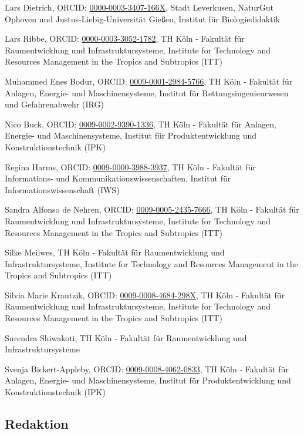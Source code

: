 \documentclass[
  letterpaper,
  DIV=11,
  numbers=noendperiod]{scrartcl}
\begin{document}
Lars Dietrich, ORCID:
\href{https://orcid.org/0000-0003-3407-166X}{0000-0003-3407-166X}, Stadt
Leverkusen, NaturGut Ophoven und Justus-Liebig-Universität Gießen,
Institut für Biologiedidaktik

Lars Ribbe, ORCID:
\href{https://orcid.org/0000-0003-3052-1782}{0000-0003-3052-1782}, TH
Köln - Fakultät für Raumentwicklung und Infrastruktursysteme, Institute
for Technology and Resources Management in the Tropics and Subtropics
(ITT)

Muhammed Enes Bodur, ORCID:
\href{https://orcid.org/0009-0001-2984-5766}{0009-0001-2984-5766}, TH
Köln - Fakultät für Anlagen, Energie- und Maschinensysteme, Institut für
Rettungsingenieurwesen und Gefahrenabwehr (IRG)

Nico Buck, ORCID:
\href{https://orcid.org/0009-0002-9390-1336}{0009-0002-9390-1336}, TH
Köln - Fakultät für Anlagen, Energie- und Maschinensysteme, Institut für
Produktentwicklung und Konstruktionstechnik (IPK)

Regina Harms, ORCID:
\href{https://orcid.org/0009-0000-3988-3937}{0009-0000-3988-3937}, TH
Köln - Fakultät für Informations- und Kommunikationswissenschaften,
Institut für Informationswissenschaft (IWS)

Sandra Alfonso de Nehren, ORCID:
\href{https://orcid.org/0009-0005-2435-7666}{0009-0005-2435-7666}, TH
Köln - Fakultät für Raumentwicklung und Infrastruktursysteme, Institute
for Technology and Resources Management in the Tropics and Subtropics
(ITT)

Silke Meilwes, TH Köln - Fakultät für Raumentwicklung und
Infrastruktursysteme, Institute for Technology and Resources Management
in the Tropics and Subtropics (ITT)

Silvia Marie Krautzik, ORCID:
\href{https://orcid.org/0009-0008-4684-298X}{0009-0008-4684-298X}, TH
Köln - Fakultät für Raumentwicklung und Infrastruktursysteme, Institute
for Technology and Resources Management in the Tropics and Subtropics
(ITT)

Surendra Shiwakoti, TH Köln - Fakultät für Raumentwicklung und
Infrastruktursysteme

Svenja Bickert-Appleby, ORCID:
\href{https://orcid.org/0009-0008-4062-0833}{0009-0008-4062-0833}, TH
Köln - Fakultät für Anlagen, Energie- und Maschinensysteme, Institut für
Produktentwicklung und Konstruktionstechnik (IPK)

\subsection{Redaktion}\label{redaktion}
\end{document}
